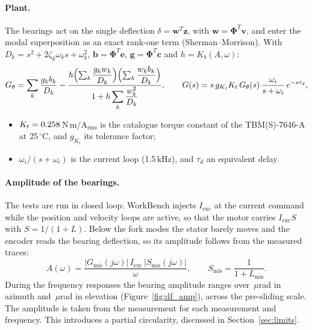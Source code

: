 \paragraph{Plant.} The bearings act on the single deflection $\delta=\mathbf w^T\mathbf z$, with $\mathbf w=\bm\Phi^T\mathbf v$, and enter the modal superposition as an exact rank-one term (Sherman--Morrison). With $D_k=s^2+2\zeta_k\omega_ks+\omega_k^2$, $\mathbf b=\bm\Phi^T\mathbf e$, $\mathbf g=\bm\Phi^T\mathbf c$ and $h=K_b(A,\omega)$:
\begin{equation}
G_\theta=\sum_k\frac{g_kb_k}{D_k}-\frac{h\Bigl(\sum_k\dfrac{g_kw_k}{D_k}\Bigr)\Bigl(\sum_k\dfrac{w_kb_k}{D_k}\Bigr)}{1+h\displaystyle\sum_k\frac{w_k^2}{D_k}},\qquad
G(s)=s\,g_{K_t}K_t\,G_\theta(s)\,\frac{\omega_i}{s+\omega_i}\,e^{-s\tau_d}, \label{eq:plant}
\end{equation}
\begin{itemize}
\item $K_t=0.258$\,N\,m/A$_\mathrm{rms}$ is the catalogue torque constant of the TBM(S)-7646-A at 25\,$^\circ$C, and $g_{K_t}$ its tolerance factor;
\item $\omega_i/(s+\omega_i)$ is the current loop (1.5\,kHz), and $\tau_d$ an equivalent delay.
\end{itemize}

\paragraph{Amplitude of the bearings.} The tests are run in closed loop: WorkBench injects $I_\mathrm{exc}$ at the current command while the position and velocity loops are active, so that the motor carries $I_\mathrm{exc}S$ with $S=1/(1+L)$. Below the fork modes the stator barely moves and the encoder reads the bearing deflection, so its amplitude follows from the measured traces:
\begin{equation}
A(\omega)=\frac{|G_\mathrm{mis}(j\omega)|\,I_\mathrm{exc}\,|S_\mathrm{mis}(j\omega)|}{\omega},\qquad S_\mathrm{mis}=\frac{1}{1+L_\mathrm{mis}} .\label{eq:amp}
\end{equation}
During the frequency responses the bearing amplitude ranges over \ArangeA\,$\mu$rad in azimuth and \ArangeP\,$\mu$rad in elevation (Figure~\ref{fig:df_amp}), across the pre-sliding scale. The amplitude is taken from the measurement for each measurement and frequency. This introduces a partial circularity, discussed in Section~\ref{sec:limits}.

